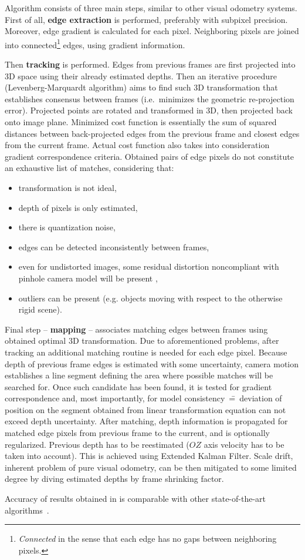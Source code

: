 Algorithm consists of three main steps, similar to other visual odometry systems. First of all, \textbf{edge extraction} is performed, preferably with subpixel precision. Moreover, edge gradient is calculated for each pixel. Neighboring pixels are joined into connected\footnote{\textit{Connected} in the sense that each edge has no gaps between neighboring pixels.} edges, using gradient information.

Then \textbf{tracking} is performed. Edges from previous frames are first projected into 3D space using their already estimated depths. Then an iterative procedure (Levenberg-Marquardt algorithm) aims to find such 3D transformation that establishes consensus between frames (i.e.~minimizes the geometric re-projection error). Projected points are rotated and transformed in 3D, then projected back onto image plane. Minimized cost function is essentially the sum of squared distances between back-projected edges from the previous frame and closest edges from the current frame. Actual cost function also takes into consideration gradient correspondence criteria. Obtained pairs of edge pixels do not constitute an exhaustive list of matches, considering that:
\begin{itemize}
\item transformation is not ideal,
\item depth of pixels is only estimated,
\item there is quantization noise,
\item edges can be detected inconsistently between frames,
\item even for undistorted images, some residual distortion noncompliant with pinhole camera model will be present \cite{barreto2007non},
\item outliers can be present (e.g. objects moving with respect to the otherwise rigid scene).
\end{itemize}
 
Final step -- \textbf{mapping} -- associates matching edges between frames using obtained optimal 3D transformation. Due to aforementioned problems, after tracking an additional matching routine is needed for each edge pixel. Because depth of previous frame edges is estimated with some uncertainty, camera motion establishes a line segment defining the area where possible matches will be searched for. Once such candidate has been found, it is tested for gradient correspondence and, most importantly, for model consistency~\==~deviation of position on the segment obtained from linear transformation equation can not exceed depth uncertainty. After matching, depth information is propagated for matched edge pixels from previous frame to the current, and is optionally regularized. Previous depth has to be reestimated ($OZ$ axis velocity has to be taken into account). This is achieved using Extended Kalman Filter. Scale drift, inherent problem of pure visual odometry, can be then mitigated to some limited degree by diving estimated depths by frame shrinking factor.

Accuracy of results obtained in \cite{jose2015realtime} is comparable with other state-of-the-art algorithms~\cite{yang2017direct}.


